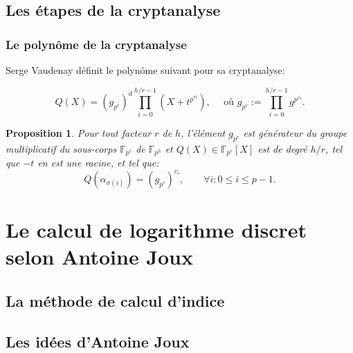 \documentclass{beamer}
\newtheorem{prop}[theo]{Proposition}
\theoremstyle{definition}
\theoremstyle{remark}
\def\gf #1{\mathbb{F}_{#1}}
\begin{document}
\subsection{Les étapes de la cryptanalyse}
\begin{frame}
	\frametitle{Le polynôme de la cryptanalyse}
        Serge Vaudenay définit le polynôme suivant pour sa cryptanalyse:

$$Q(X) = (g_{p^r})^{d} \prod_{i=0}^{h/r-1} \left(X+t^{p^{ri}}\right), \quad \text{ où } g_{p^r} := \prod_{i=0}^{h/r-1} g^{p^{ri}}.$$
        \begin{prop}
Pour tout facteur $r$ de $h$, l'élément $g_{p^r}$ est générateur du groupe multiplicatif du sous-corps $\gf{p^r}$ de $\gf{p^h}$ et $Q(X) \in \gf{p^r}[X]$ est de degré $h/r$, tel que $-t$ en est une racine, et tel que:
$$Q\left(\alpha_{\sigma(i)}\right) = (g_{p^r})^{c_i},\qquad \forall i : 0\leqslant i \leqslant p-1.$$
\end{prop}
\end{frame}

\section{Le calcul de logarithme discret selon Antoine Joux}
\subsection{La méthode de calcul d'indice}
\begin{frame}
	\frametitle{}

\end{frame}

\subsection{Les idées d'Antoine Joux}
\begin{frame}
	\frametitle{}

\end{frame}
\end{document}
